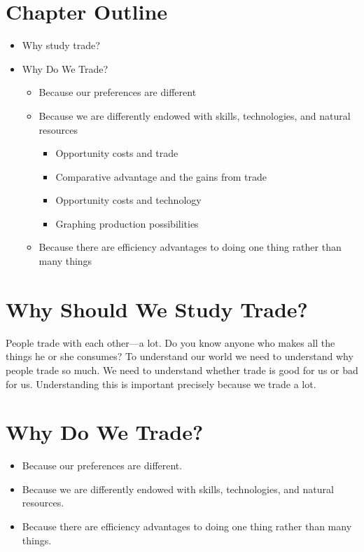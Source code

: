 \documentclass[
  letterpaper,
]{book}
\begin{document}
\section{Chapter Outline}\label{chapter-outline-1}

\begin{itemize}
\item
  Why study trade?
\item
  Why Do We Trade?

  \begin{itemize}
  \item
    Because our preferences are different
  \item
    Because we are differently endowed with skills, technologies, and
    natural resources

    \begin{itemize}
    \item
      Opportunity costs and trade
    \item
      Comparative advantage and the gains from trade
    \item
      Opportunity costs and technology
    \item
      Graphing production possibilities
    \end{itemize}
  \item
    Because there are efficiency advantages to doing one thing rather
    than many things
  \end{itemize}
\end{itemize}

\section{Why Should We Study Trade?}\label{why-should-we-study-trade}

People trade with each other---a lot. Do you know anyone who makes all
the things he or she consumes? To understand our world we need to
understand why people trade so much. We need to understand whether trade
is good for us or bad for us. Understanding this is important precisely
because we trade a lot.

\section{Why Do We Trade?}\label{why-do-we-trade}

\begin{itemize}
\item
  Because our preferences are different.
\item
  Because we are differently endowed with skills, technologies, and
  natural resources.
\item
  Because there are efficiency advantages to doing one thing rather than
  many things.
\end{itemize}
\end{document}
